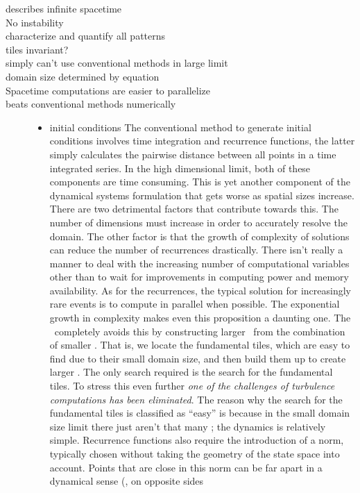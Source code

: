 \begin{description}
{\begin{description}
\item[describes infinite spacetime]
\item[No instability]
\item[characterize and quantify all patterns]
\item[tiles invariant?]
\item[simply can't use conventional methods in large limit]
\item[domain size determined by equation]
\item[Spacetime computations are easier to parallelize]
\item[beats conventional methods numerically]
    \begin{itemize}
    \item initial conditions
    The conventional method to generate initial conditions
involves time integration and recurrence functions, the latter simply
calculates the pairwise distance between all points in a time integrated
series.%
In the high dimensional limit, both
of these components are time consuming. This is yet another
component of the dynamical systems formulation that gets worse
as spatial sizes increase. There are two detrimental factors
that contribute towards this. The number of dimensions must increase
in order to accurately resolve the domain. The other factor is that
the growth of complexity of solutions can reduce the number of recurrences
drastically. There isn't really a manner to deal with the increasing
number of computational variables other than to wait for improvements
in computing power and memory availability. As for the recurrences, the
typical solution for increasingly rare events is to compute in parallel when
possible. The exponential growth in complexity makes even this proposition
a daunting one.
The \spt\ completely avoids this by constructing larger \twots\
from the combination of smaller \twots. That is,
we locate the fundamental tiles, which are easy to find due to their small
domain size, and then build them up to create larger \twots. The only
search required is the search for the fundamental tiles. To stress
this even further \textit{one of the challenges of turbulence
computations has been eliminated}. The reason
why the search for the fundamental tiles is classified as ``easy'' is because
in the small domain size limit there just aren't that many \twots; the dynamics
is relatively simple.
Recurrence functions also require the introduction of a norm,
typically chosen without taking the geometry of the state space into account.
Points that are close in this norm can be far apart in a dynamical sense (\ie, on opposite sides

\end{itemize}
\end{description}}
\end{description}
